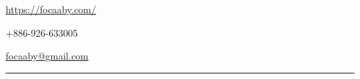 \documentclass[]{deedy-resume-openfont}
\begin{document}
%
%

%
%


\begin{minipage}[t]{0.5\textwidth}
\end{minipage}
\hfill
\begin{minipage}[t]{0.5\textwidth}
    \begin{tightemize}
        \item[] \href{https://focaaby.com/}{https://focaaby.com/}
        \item[] {+886-926-633005}
        \item[] \href{mailto:focaaby@gmail.com}{focaaby@gmail.com}
    \end{tightemize}
\end{minipage}

\par\noindent\rule{\textwidth}{0.5pt} %

%
%
\end{document}
